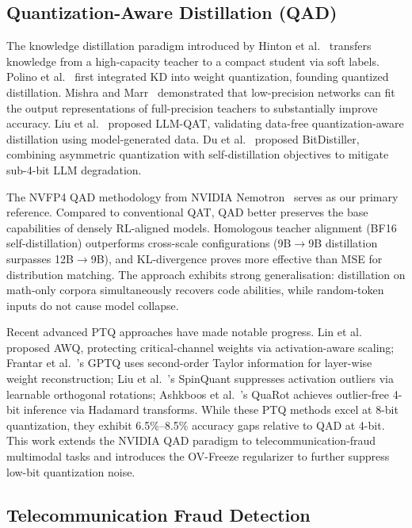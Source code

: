 \documentclass[11pt, a4paper]{article}
\begin{document}
\subsection{Quantization-Aware Distillation (QAD)}

The knowledge distillation paradigm introduced by Hinton et al.~\cite{4} transfers knowledge from a high-capacity teacher to a compact student via soft labels. Polino et al.~\cite{5} first integrated KD into weight quantization, founding quantized distillation. Mishra and Marr~\cite{6} demonstrated that low-precision networks can fit the output representations of full-precision teachers to substantially improve accuracy. Liu et al.~\cite{7} proposed LLM-QAT, validating data-free quantization-aware distillation using model-generated data. Du et al.~\cite{8} proposed BitDistiller, combining asymmetric quantization with self-distillation objectives to mitigate sub-4-bit LLM degradation.

The NVFP4 QAD methodology from NVIDIA Nemotron~\cite{3} serves as our primary reference. Compared to conventional QAT, QAD better preserves the base capabilities of densely RL-aligned models. Homologous teacher alignment (BF16 self-distillation) outperforms cross-scale configurations (9B$\rightarrow$9B distillation surpasses 12B$\rightarrow$9B), and KL-divergence proves more effective than MSE for distribution matching. The approach exhibits strong generalisation: distillation on math-only corpora simultaneously recovers code abilities, while random-token inputs do not cause model collapse.

Recent advanced PTQ approaches have made notable progress. Lin et al.~\cite{9} proposed AWQ, protecting critical-channel weights via activation-aware scaling; Frantar et al.~\cite{10}'s GPTQ uses second-order Taylor information for layer-wise weight reconstruction; Liu et al.~\cite{11}'s SpinQuant suppresses activation outliers via learnable orthogonal rotations; Ashkboos et al.~\cite{12}'s QuaRot achieves outlier-free 4-bit inference via Hadamard transforms. While these PTQ methods excel at 8-bit quantization, they exhibit 6.5\%--8.5\% accuracy gaps relative to QAD at 4-bit. This work extends the NVIDIA QAD paradigm to telecommunication-fraud multimodal tasks and introduces the OV-Freeze regularizer to further suppress low-bit quantization noise.

\subsection{Telecommunication Fraud Detection}
\end{document}
